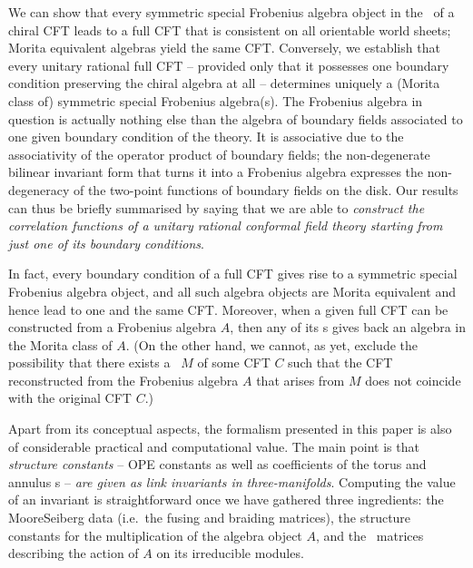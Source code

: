 \medskip

We can show that every symmetric special Frobenius algebra object in the 
\mtc\ of a chiral CFT leads to 
a full CFT that is consistent on all orientable world sheets; Morita
equivalent algebras yield the same CFT. Conversely, we establish that every
unitary rational full CFT -- provided only that it possesses one 
boundary condition preserving the chiral algebra
at all -- determines uniquely a (Morita class of)
symmetric special Frobenius algebra(s).  
The Frobenius algebra in question is actually nothing else than the algebra of
boundary fields associated to one given boundary condition of the theory.
It is associative due to the associativity of the operator product of boundary 
fields; the non-degenerate bilinear invariant form that turns it into a Frobenius 
algebra expresses the non-degeneracy of the two-point functions of boundary
fields on the disk. Our results can thus be briefly summarised by saying that 
we are able to {\em construct the correlation functions of a unitary rational 
conformal field theory starting from just one of its boundary conditions\/}.

In fact, every boundary condition of a full CFT gives rise to a symmetric 
special Frobenius algebra object, and all such algebra objects are Morita 
equivalent and hence lead to one and the same CFT.
Moreover, when a given full CFT can be constructed from a Frobenius
algebra $A$, then any of its \bc s gives back an algebra in the Morita
class of $A$. (On the other hand, we cannot, as yet, exclude the
possibility that there exists a \bc\ $M$ of some CFT $C$ such that
the CFT reconstructed from the Frobenius algebra $A$ that arises from 
$M$ does not coincide with the original CFT $C$.)

\medskip

Apart from its conceptual aspects, the formalism presented in this paper
is also of considerable practical and computational value. The main point 
is that {\em structure constants\/} -- OPE constants as well as coefficients 
of the torus and annulus \parfu s -- {\em are given as link invariants 
in three-manifolds\/}.  Computing the value of an invariant is 
straightforward once we have gathered three ingredients: the 
Moore\hy Seiberg data (i.e.\ the fusing and braiding matrices), the 
structure constants for the multiplication of the algebra object $A$, and 
the \rep\ matrices describing the action of $A$ on its irreducible modules. 


